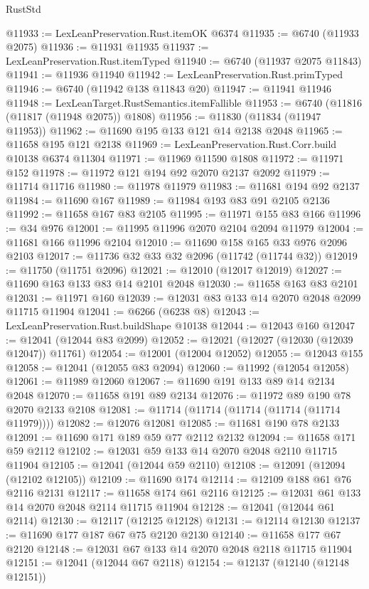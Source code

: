 \begin{lexlean}{RustStd}
\begin{coremodule}
@11933 := LexLeanPreservation.Rust.itemOK @6374
@11935 := @6740 (@11933 @2075)
@11936 := @11931 @11935
@11937 := LexLeanPreservation.Rust.itemTyped
@11940 := @6740 (@11937 @2075 @11843)
@11941 := @11936 @11940
@11942 := LexLeanPreservation.Rust.primTyped
@11946 := @6740 (@11942 @138 @11843 @20)
@11947 := @11941 @11946
@11948 := LexLeanTarget.RustSemantics.itemFallible
@11953 := @6740 (@11816 (@11817 (@11948 @2075)) @1808)
@11956 := @11830 (@11834 (@11947 @11953))
@11962 := @11690 @195 @133 @121 @14 @2138 @2048
@11965 := @11658 @195 @121 @2138
@11969 := LexLeanPreservation.Rust.Corr.build @10138 @6374 @11304
@11971 := @11969 @11590 @1808
@11972 := @11971 @152
@11978 := @11972 @121 @194 @92 @2070 @2137 @2092
@11979 := @11714 @11716
@11980 := @11978 @11979
@11983 := @11681 @194 @92 @2137
@11984 := @11690 @167
@11989 := @11984 @193 @83 @91 @2105 @2136
@11992 := @11658 @167 @83 @2105
@11995 := @11971 @155 @83 @166
@11996 := @34 @976
@12001 := @11995 @11996 @2070 @2104 @2094 @11979
@12004 := @11681 @166 @11996 @2104
@12010 := @11690 @158 @165 @33 @976 @2096 @2103
@12017 := @11736 @32 @33 @32 @2096 (@11742 (@11744 @32))
@12019 := @11750 (@11751 @2096)
@12021 := @12010 (@12017 @12019)
@12027 := @11690 @163 @133 @83 @14 @2101 @2048
@12030 := @11658 @163 @83 @2101
@12031 := @11971 @160
@12039 := @12031 @83 @133 @14 @2070 @2048 @2099 @11715 @11904
@12041 := @6266 (@6238 @8)
@12043 := LexLeanPreservation.Rust.buildShape @10138
@12044 := @12043 @160
@12047 := @12041 (@12044 @83 @2099)
@12052 := @12021 (@12027 (@12030 (@12039 @12047)) @11761)
@12054 := @12001 (@12004 @12052)
@12055 := @12043 @155
@12058 := @12041 (@12055 @83 @2094)
@12060 := @11992 (@12054 @12058)
@12061 := @11989 @12060
@12067 := @11690 @191 @133 @89 @14 @2134 @2048
@12070 := @11658 @191 @89 @2134
@12076 := @11972 @89 @190 @78 @2070 @2133 @2108
@12081 := @11714 (@11714 (@11714 (@11714 (@11714 @11979))))
@12082 := @12076 @12081
@12085 := @11681 @190 @78 @2133
@12091 := @11690 @171 @189 @59 @77 @2112 @2132
@12094 := @11658 @171 @59 @2112
@12102 := @12031 @59 @133 @14 @2070 @2048 @2110 @11715 @11904
@12105 := @12041 (@12044 @59 @2110)
@12108 := @12091 (@12094 (@12102 @12105))
@12109 := @11690 @174
@12114 := @12109 @188 @61 @76 @2116 @2131
@12117 := @11658 @174 @61 @2116
@12125 := @12031 @61 @133 @14 @2070 @2048 @2114 @11715 @11904
@12128 := @12041 (@12044 @61 @2114)
@12130 := @12117 (@12125 @12128)
@12131 := @12114 @12130
@12137 := @11690 @177 @187 @67 @75 @2120 @2130
@12140 := @11658 @177 @67 @2120
@12148 := @12031 @67 @133 @14 @2070 @2048 @2118 @11715 @11904
@12151 := @12041 (@12044 @67 @2118)
@12154 := @12137 (@12140 (@12148 @12151))

\end{coremodule}
\end{lexlean}
